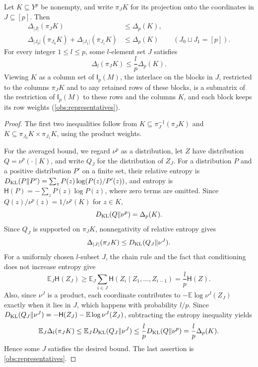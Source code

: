 \documentclass[11pt,letterpaper]{article} \usepackage[utf8]{inputenc}
\theoremstyle{plain} \newtheorem{theorem}{Theorem}[section]
\theoremstyle{definition} \newaliascnt{definition}{theorem}
\newcommand{\Int}[2]{\mathsf{I}_{#1}(#2)}
\newcommand{\card}[1]{\lvert#1\rvert}
\begin{document}
\begin{lemma}\label{cl:projection}
Let $K\subseteq Y^p$ be nonempty, and write $\pi_JK$ for its projection onto the
coordinates in $J\subseteq[p]$. Then
\begin{align*}
 \Delta_{\card J}(\pi_JK)&\le\Delta_p(K),\\
 \Delta_{\card{J_0}}(\pi_{J_0}K)+\Delta_{\card{J_1}}(\pi_{J_1}K)
 &\le\Delta_p(K) &&(J_0\sqcup J_1=[p]).
\end{align*}
For every integer $1\le l\le p$, some $l$-element set $J$ satisfies
\[
\Delta_l(\pi_JK)\le\frac lp\Delta_p(K).
\]
Viewing $K$ as a column set of $\Int{p}{M}$, the interlace on the blocks in
$J$, restricted to the columns $\pi_JK$ and to any retained rows of these
blocks, is a submatrix of the restriction of $\Int{p}{M}$ to these rows and the
columns $K$, and each block keeps its row weights (\cref{obs:representatives}).
\end{lemma}

\begin{proof}
The first two inequalities follow from
$K\subseteq\pi_J^{-1}(\pi_JK)$ and
$K\subseteq\pi_{J_0}K\times\pi_{J_1}K$, using the product weights.

For the averaged bound, we regard $\nu^p$ as a distribution, let $Z$ have distribution $Q=\nu^p(\cdot\mid K)$, and
write $Q_J$ for the distribution of $Z_J$.
For a distribution $P$ and a positive distribution $P'$ on a finite set, their relative entropy is
$D_{\rm KL}(P\|P')=\sum_zP(z)\log(P(z)/P'(z))$, and entropy is
$\mathsf H(P)=-\sum_zP(z)\log P(z)$, where zero terms are omitted.
Since $Q(z)/\nu^p(z)=1/\nu^p(K)$ for $z\in K$,
\[
D_{\rm KL}(Q\|\nu^p)=\Delta_p(K).
\]
Since $Q_J$ is supported on $\pi_JK$, nonnegativity of relative entropy gives
\[
\Delta_{|J|}(\pi_JK)\le D_{\rm KL}(Q_J\|\nu^J).
\]
For a uniformly chosen $l$-subset $J$, the chain rule and the fact that
conditioning does not increase entropy give
\[
\mathbb E_J\mathsf H(Z_J)
\ge\mathbb E_J\sum_{i\in J}\mathsf H(Z_i\mid Z_1,\ldots,Z_{i-1})
=\frac lp\mathsf H(Z).
\]
Also, since $\nu^J$ is a product, each coordinate contributes to
$-\mathbb E\log\nu^J(Z_J)$ exactly when it lies in $J$, which happens with probability $l/p$. Since
$D_{\rm KL}(Q_J\|\nu^J)=-\mathsf H(Z_J)-\mathbb E\log\nu^J(Z_J)$, subtracting the entropy
inequality yields
\[
\mathbb E_J\Delta_l(\pi_JK)
\le\mathbb E_JD_{\rm KL}(Q_J\|\nu^J)
\le\frac lpD_{\rm KL}(Q\|\nu^p)=\frac lp\Delta_p(K).
\]
Hence some $J$ satisfies the desired bound. The last assertion is \cref{obs:representatives}.
\end{proof}
\end{document}
